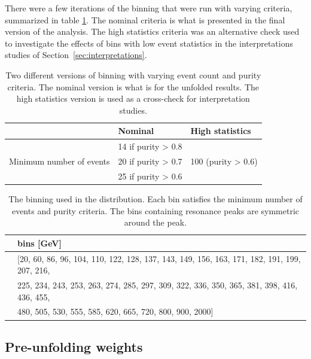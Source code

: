 There were a few iterations of the binning that were run with varying criteria, summarized in table \ref{tab:BinningVersions}. The nominal criteria is what is presented in the final version of the analysis. The high statistics criteria was an alternative check used to investigate the effects of bins with low event statistics in the interpretations studies of Section~\ref{sec:interpretations}.

\begin{table}[bp]
  \begin{tabular}{c | ll}
  \hline
                & Nominal              & High statistics             \\
    \midrule
                                & 14 if purity > 0.8 &   \\
     Minimum number of events & 20 if purity > 0.7 & 100 (purity > 0.6)  \\
                                &25 if purity > 0.6 &    \\
    \hline
  \end{tabular}
  \caption{Two different versions of binning with varying event count and purity criteria. The nominal version is what is for the unfolded results. The high statistics version is used as a cross-check for interpretation studies.}
  \label{tab:BinningVersions}
\end{table}

\begin{table}[ht]  
    \begin{tabular}{ c | l}
        \hline
         & \mFourL{} bins [GeV]\\
        \hline
         \mFourL{} &  [20, 60, 86, 96, 104, 110, 122, 128, 137, 143, 149, 156, 163, 171, 182, 191, 199, 207, 216, \\
         			& 225, 234, 243, 253, 263, 274, 285, 297, 309, 322, 336, 350, 365, 381, 398, 416, 436, 455,   \\
        		& 480, 505, 530, 555, 585, 620, 665, 720, 800, 900, 2000] \\
        
        \hline
    \end{tabular}
    \caption{The binning used in the \mFourL{} distribution. Each bin satisfies the minimum number of events and purity criteria. The bins containing resonance peaks are symmetric around the peak.}
    \label{tab:m4lbin}
\end{table}  

\subsection{Pre-unfolding weights}
\label{subsec:preuf}

